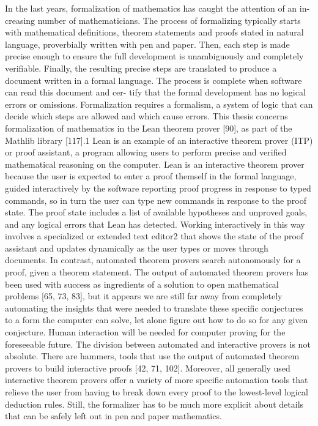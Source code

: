 \documentclass{book}
\theoremstyle{definition}
\begin{document}
In the last years, formalization of mathematics has caught the attention of an in- creasing number of mathematicians. The process of formalizing typically starts with mathematical definitions, theorem statements and proofs stated in natural language, proverbially written with pen and paper. Then, each step is made precise enough to ensure the full development is unambiguously and completely verifiable. Finally, the resulting precise steps are translated to produce a document written in a formal language. The process is complete when software can read this document and cer- tify that the formal development has no logical errors or omissions. Formalization requires a formalism, a system of logic that can decide which steps are allowed and which cause errors.
This thesis concerns formalization of mathematics in the Lean theorem prover [90], as part of the Mathlib library [117].1 Lean is an example of an interactive theorem prover (ITP) or proof assistant, a program allowing users to perform precise and verified mathematical reasoning on the computer. Lean is an interactive theorem prover because the user is expected to enter a proof themself in the formal language, guided interactively by the software reporting proof progress in response to typed commands, so in turn the user can type new commands in response to the proof state. The proof state includes a list of available hypotheses and unproved goals, and any logical errors that Lean has detected. Working interactively in this way involves a specialized or extended text editor2 that shows the state of the proof assistant and updates dynamically as the user types or moves through documents.
In contrast, automated theorem provers search autonomously for a proof, given a theorem statement. The output of automated theorem provers has been used with success as ingredients of a solution to open mathematical problems [65, 73, 83], but it appears we are still far away from completely automating the insights that were needed to translate these specific conjectures to a form the computer can solve, let alone figure out how to do so for any given conjecture. Human interaction will be needed for computer proving for the foreseeable future.
The division between automated and interactive provers is not absolute. There are hammers, tools that use the output of automated theorem provers to build interactive proofs [42, 71, 102]. Moreover, all generally used interactive theorem provers offer a variety of more specific automation tools that relieve the user from having to break down every proof to the lowest-level logical deduction rules. Still, the formalizer has to be much more explicit about details that can be safely left out in pen and paper mathematics.
\end{document}
